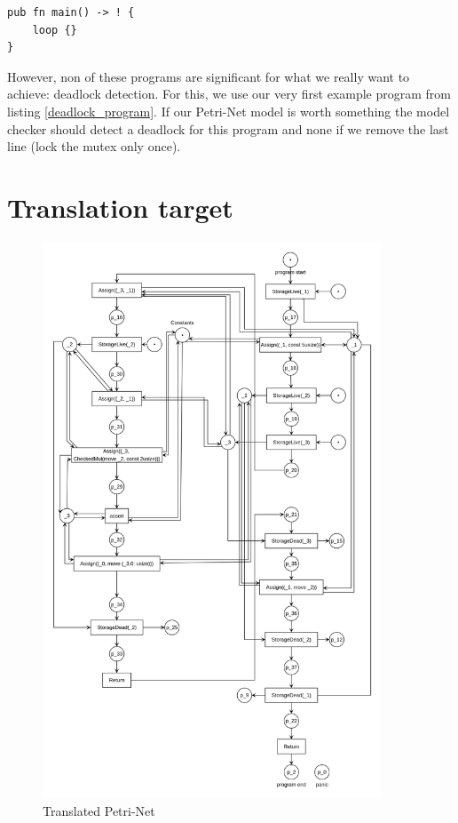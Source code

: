 \begin{lstlisting}
pub fn main() -> ! {
    loop {}
}
\end{lstlisting}
However, non of these programs are significant for what we really want to achieve: deadlock detection.
For this, we use our very first example program from listing \ref{deadlock_program}.
If our Petri-Net model is worth something the model checker should detect a deadlock for this program and none if we remove the last line (lock the mutex only once).

\section{Translation target}
\begin{figure}
  \centering
  \includegraphics[width=0.9\textwidth]{../diagrams/FunctionCallNet.png}
  \caption{Translated Petri-Net}
  \label{function_call_net}
\end{figure}
